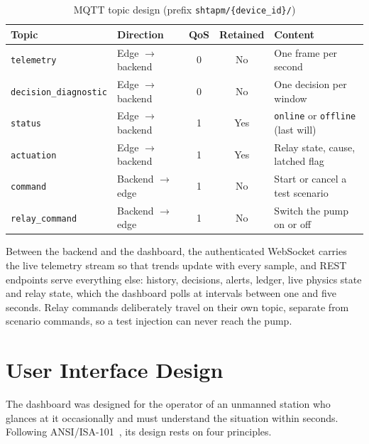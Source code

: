 \begin{table}[htbp]
\centering
\caption{MQTT topic design (prefix \texttt{shtapm/\{device\_id\}/})}
\label{tab:topics}
\small
\begin{tabularx}{\textwidth}{@{}P{3.9cm} P{2.7cm} c c X@{}}
\toprule
\textbf{Topic} & \textbf{Direction} & \textbf{QoS} & \textbf{Retained} & \textbf{Content} \\
\midrule
\texttt{telemetry} & Edge $\rightarrow$ backend & 0 & No & One frame per second \\
\texttt{decision\_\allowbreak diagnostic} & Edge $\rightarrow$ backend & 0 & No & One decision per window \\
\texttt{status} & Edge $\rightarrow$ backend & 1 & Yes & \texttt{online} or \texttt{offline} (last will) \\
\texttt{actuation} & Edge $\rightarrow$ backend & 1 & Yes & Relay state, cause, latched flag \\
\texttt{command} & Backend $\rightarrow$ edge & 1 & No & Start or cancel a test scenario \\
\texttt{relay\_command} & Backend $\rightarrow$ edge & 1 & No & Switch the pump on or off \\
\bottomrule
\end{tabularx}
\end{table}

Between the backend and the dashboard, the authenticated WebSocket carries the live telemetry stream so that trends update with every sample, and REST endpoints serve everything else: history, decisions, alerts, ledger, live physics state and relay state, which the dashboard polls at intervals between one and five seconds. Relay commands deliberately travel on their own topic, separate from scenario commands, so a test injection can never reach the pump.

\section{User Interface Design}

The dashboard was designed for the operator of an unmanned station who glances at it occasionally and must understand the situation within seconds. Following ANSI/ISA-101~\cite{isa101}, its design rests on four principles.

